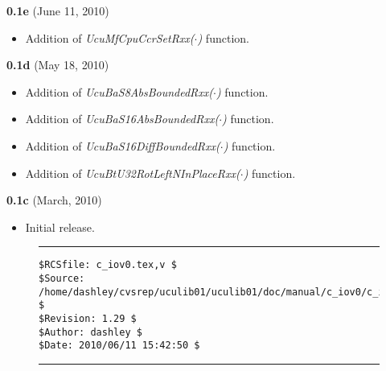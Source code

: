\noindent\textbf{0.1e} (June 11, 2010)
\begin{itemize}
\item Addition of \emph{UcuMfCpuCcrSetRxx($\cdot$)} function.
\end{itemize}

\noindent\textbf{0.1d} (May 18, 2010)
\begin{itemize}
\item Addition of \emph{UcuBaS8AbsBoundedRxx($\cdot$)} function.
\item Addition of \emph{UcuBaS16AbsBoundedRxx($\cdot$)} function.
\item Addition of \emph{UcuBaS16DiffBoundedRxx($\cdot$)} function.
\item Addition of \emph{UcuBtU32RotLeftNInPlaceRxx($\cdot$)} function.
\end{itemize}

\noindent\textbf{0.1c} (March, 2010)
\begin{itemize}
\item Initial release.
\end{itemize}


\noindent\begin{figure}[!b]
\noindent\rule[-0.25in]{\textwidth}{1pt}
\begin{tiny}
\begin{verbatim}
$RCSfile: c_iov0.tex,v $
$Source: /home/dashley/cvsrep/uculib01/uculib01/doc/manual/c_iov0/c_iov0.tex,v $
$Revision: 1.29 $
$Author: dashley $
$Date: 2010/06/11 15:42:50 $
\end{verbatim}
\end{tiny}
\noindent\rule[0.25in]{\textwidth}{1pt}
\end{figure}


